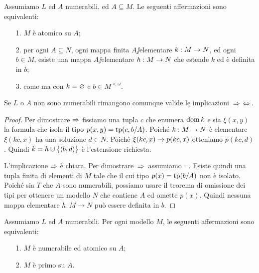 \begin{lemma}\label{atomicoestensione}
Assumiamo $L$ ed $A$ numerabili, ed $A\subseteq M$. Le seguenti affermazioni sono equivalenti:
\begin{itemize}
\item[1.] $M$ \`e atomico su $A$;
\item[2.] per ogni $A\subseteq N$, ogni mappa finita $A\jj$elementare $k:M\rightarrow N$, ed ogni $b\in M$, esiste una mappa $A\jj$elementare $h:M\rightarrow N$ che estende $k$ ed \`e definita in $b$;
\item[3.] come  ma con $k=\varnothing$ e $b\in M^{<\omega}$.
\end{itemize}
Se $L$ o $A$ non sono numerabili rimangono comunque valide le implicazioni $\,\Rightarrow\,$$\,\Leftrightarrow\,$.
\end{lemma}
\begin{proof}
Per dimostrare $\Rightarrow$ fissiamo una tupla $c$ che enumera $\mathop{\rm dom} k$ e sia $\xi(x,y)$ la formula che isola il tipo  $p(x,y)=\textrm{tp}(c,b/A)$. Poich\'e $k:M\rightarrow N$ \`e elementare $\xi(kc,x)$ ha una soluzione $d\in N$. Poich\'e $\xi(kc,x)\rightarrow p(kc,x)$ otteniamo $p(kc,d)$. Quindi $k=h\cup\{\langle b,d\rangle\}$ \`e l'estensione richiesta.

L'implicazione $\Rightarrow$ \`e chiara. Per dimostrare $\,\Rightarrow\,$ assumiamo $\neg$. Esiste quindi una tupla finita di elementi di $M$ tale che il cui tipo $p(x)=\textrm{tp}(b/A)$ non \`e isolato. Poich\'e sia $T$ che $A$ sono numerabili, possiamo usare il teorema di omissione dei tipi per ottenere un modello $N$ che contiene $A$ ed omette $p(x)$. Quindi nessuna mappa elementare $h:M\to N$ pu\`o essere definita in $b$.
\end{proof}

\begin{theorem}\label{atomicoprimo}
Assumiamo $L$ ed $A$ numerabili. Per ogni modello $M$, le seguenti affermazioni sono equivalenti:
\begin{itemize}
\item[1.] $M$ \`e numerabile ed atomico su $A$;
\item[2.] $M$ \`e primo su $A$.
\end{itemize}
\end{theorem}


